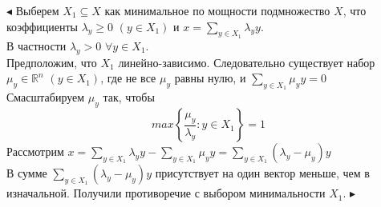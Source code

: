 $\blacktriangleleft$ Выберем $X_{1} \subseteq X$ как минимальное по мощности подмножество $X$, что коэффициенты $\lambda_{y} \geq 0$ $(y \in X_{1})$ и $\displaystyle x=\sum_{y \in X_{1}} \lambda_{y} y$.\\
В частности $\lambda_{y} > 0$ $\forall y \in X_{1}$.\\
Предположим, что $X_{1}$ линейно-зависимо. Следовательно существует набор $\mu_{y} \in \mathbb{R}^{n}$ $(y \in X_{1})$, где не все $\mu_{y}$ равны нулю, и $\displaystyle\sum_{y \in X_{1}} \mu_{y} y = 0$\\
Смасштабируем $\mu_{y}$ так, чтобы
\begin{equation*}
\displaystyle max\left\lbrace \frac{\mu_{y}}{\lambda_{y} }: y \in X_{1}\right\rbrace = 1
\end{equation*}
Рассмотрим $\displaystyle x=\sum_{y \in X_{1}} \lambda_{y} y - \sum_{y \in X_{1}} \mu_{y} y =\sum_{y \in X_{1}} \left(\lambda_{y}-\mu_{y}\right) y$\\
В сумме $\sum_{y \in X_{1}} \left(\lambda_{y}-\mu_{y}\right) y$ присутствует на один вектор меньше, чем в изначальной. Получили противоречие с выбором минимальности $X_{1}$. $\blacktriangleright$\\

